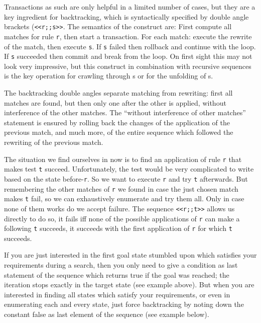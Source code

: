 Transactions as such are only helpful in a limited number of cases, but they are a key ingredient for backtracking, which is syntactically specified by double angle brackets (\texttt{<<r;;s>>}.
The semantics of the construct are:
First compute all matches for rule \texttt{r}, then start a transaction.
For each match: execute the rewrite of the match, then execute \texttt{s}.
If \texttt{s} failed then rollback and continue with the loop.
If \texttt{s} succeeded then commit and break from the loop.
On first sight this may not look very impressive, but this construct in combination with recursive sequences is the key operation for crawling through s or for the unfolding of s.

The backtracking double angles separate matching from rewriting: first all matches are found, but then only one after the other is applied, without interference of the other matches.
The ``without interference of other matches'' statement is ensured by rolling back the changes of the application of the previous match, and much more, of the entire sequence which followed the rewriting of the previous match.

\begin{example}
The situation we find ourselves in now is to find an application of rule \texttt{r} that makes test \texttt{t} succeed. Unfortunately, the test would be very complicated to write based on the state before-\texttt{r}. So we want to execute \texttt{r} and try \texttt{t} afterwards. But remembering the other matches of \texttt{r} we found in case the just chosen match makes \texttt{t} fail, so we can exhaustively enumerate and try them all. Only in case none of them works do we accept failure.
The sequence \verb#<<r;;t>># allows us directly to do so, it fails iff none of the possible applications of \texttt{r} can make a following \texttt{t} succeeds, it succeeds with the first application of \texttt{r} for which \texttt{t} succeeds. 
\end{example}

If you are just interested in the first goal state stumbled upon which satisfies your requirements during a search,
then you only need to give a condition as last statement of the sequence which returns true if the goal was reached; the iteration stops exactly in the target state (see example above).
But when you are interested in finding all states which satisfy your requirements, or even in enumerating each and every state, just force backtracking by noting down the constant false as last element of the sequence (see example below).


